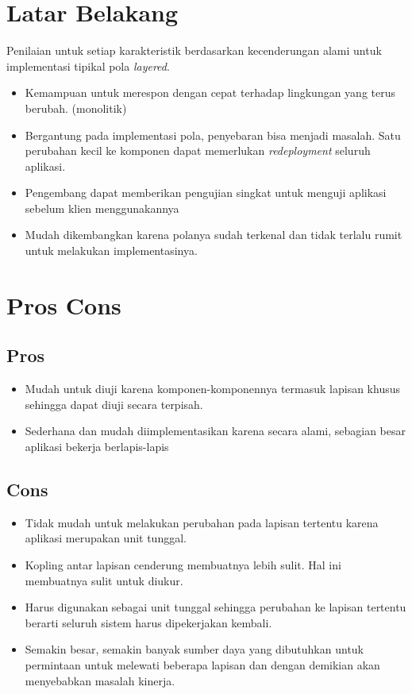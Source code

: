 \section{Latar Belakang}

Penilaian untuk setiap karakteristik berdasarkan kecenderungan alami untuk implementasi tipikal pola \textit{layered}.

\begin{itemize}
    \item Kemampuan untuk merespon dengan cepat terhadap lingkungan yang terus berubah. (monolitik)
    \item Bergantung pada implementasi pola, penyebaran bisa menjadi masalah. Satu perubahan kecil ke komponen dapat memerlukan \textit{redeployment} seluruh aplikasi.
    \item Pengembang dapat memberikan pengujian singkat untuk menguji aplikasi sebelum klien menggunakannya
    \item Mudah dikembangkan karena polanya sudah terkenal dan tidak terlalu rumit untuk melakukan implementasinya.
\end{itemize}

\section{Pros Cons}

\subsection{Pros}

\begin{itemize}
    \item Mudah untuk diuji karena komponen-komponennya termasuk lapisan khusus sehingga dapat diuji secara terpisah.
    \item Sederhana dan mudah diimplementasikan karena secara alami, sebagian besar aplikasi bekerja berlapis-lapis
\end{itemize}

\subsection{Cons}

\begin{itemize}
    \item Tidak mudah untuk melakukan perubahan pada lapisan tertentu karena aplikasi merupakan unit tunggal.
    \item Kopling antar lapisan cenderung membuatnya lebih sulit. Hal ini membuatnya sulit untuk diukur.
    \item Harus digunakan sebagai unit tunggal sehingga perubahan ke lapisan tertentu berarti seluruh sistem harus dipekerjakan kembali.
    \item Semakin besar, semakin banyak sumber daya yang dibutuhkan untuk permintaan untuk melewati beberapa lapisan dan dengan demikian akan menyebabkan masalah kinerja.
\end{itemize}

